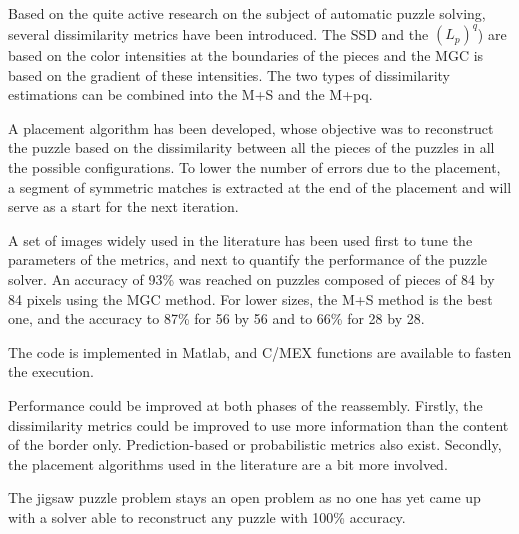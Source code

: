 Based on the quite active research on the subject of automatic puzzle solving, several dissimilarity metrics have been introduced. The SSD and the $(L_p)^q$) are based on the color intensities at the boundaries of the pieces and the MGC is based on the gradient of these intensities. The two types of dissimilarity estimations can be combined into the M+S and the M+pq.

A placement algorithm has been developed, whose objective was to reconstruct the puzzle based on the dissimilarity between all the pieces of the puzzles in all the possible configurations. To lower the number of errors due to the placement, a segment of symmetric matches is extracted at the end of the placement and will serve as a start for the next iteration.

A set of images widely used in the literature has been used first to tune the parameters of the metrics, and next to quantify the performance of the puzzle solver. An accuracy of 93\% was reached on puzzles composed of pieces of 84 by 84 pixels using the MGC method. For lower sizes, the M+S method is the best one, and the accuracy to 87\% for 56 by 56 and to 66\% for 28 by 28.

The code is implemented in Matlab, and C/MEX functions are available to fasten the execution.

Performance could be improved at both phases of the reassembly. Firstly, the dissimilarity metrics could be improved to use more information than the content of the border only. Prediction-based or probabilistic metrics also exist. Secondly, the placement algorithms used in the literature are a bit more involved.

The jigsaw puzzle problem stays an open problem as no one has yet came up with a solver able to reconstruct any puzzle with 100\% accuracy.